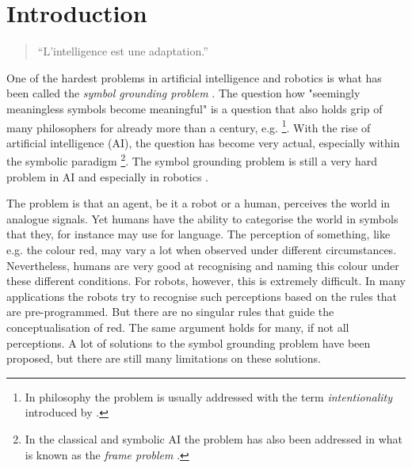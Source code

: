 


\chapter{Introduction}\label{ch:intro}


\begin{quote}
{\large ``L'intelligence est une adaptation.''\\
\cite{piaget:1966}}
\end{quote}


One of the hardest problems in artificial intelligence and robotics is what has been called the {\em symbol grounding problem} \citep{harnad:1990}. The question how "seemingly meaningless symbols become meaningful" \citep{harnad:1990} is a question that also holds grip of many philosophers for already more than a century, e.g. \citep{bretano:1874,searle:1980,dennett:1991}\footnote{In philosophy the problem is usually addressed with the term {\em intentionality} introduced by \citep{bretano:1874}.}. With the rise of artificial intelligence (AI), the question has become very actual, especially within the symbolic paradigm \citep{newell:1990}\footnote{In the classical and symbolic AI the problem has also been addressed in what is known as the {\em frame problem} \citep{pylyshyn:1987}.}. The symbol grounding problem is still a very hard problem in AI and especially in robotics \citep{pfeiferscheier:1999}.

The problem is that an agent, be it a robot or a human, perceives the world in analogue signals. Yet humans have the ability to categorise the world in symbols that they, for instance may use for language. The perception of something, like e.g. the colour red, may vary a lot when observed under different circumstances. Nevertheless, humans are very good at recognising and naming this colour under these different conditions. For robots, however, this is extremely difficult. In many applications the robots try to recognise such perceptions based on the rules that are pre-programmed. But there are no singular rules that guide the conceptualisation of red. The same argument holds for many, if not all perceptions. A lot of solutions to the symbol grounding problem have been proposed, but there are still many limitations on these solutions. 

